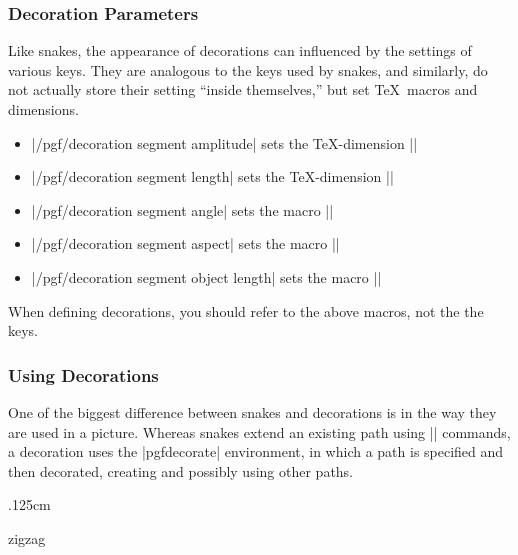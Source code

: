 \subsubsection{Decoration Parameters}

Like snakes, the appearance of decorations can influenced by the 
settings of various keys. They are analogous to the keys used 
by snakes, and similarly, do not actually store their
setting ``inside themselves,'' but set \TeX\ macros and dimensions.

\begin{itemize}
	\item |/pgf/decoration segment amplitude| 
		sets the \TeX-dimension |\pgfdecorationsegmentamplitude|
		
	\item |/pgf/decoration segment length| 
		sets the \TeX-dimension |\pgfdecorationsegmentlength|
		
	\item |/pgf/decoration segment angle| 
		sets the macro |\pgfdecorationsegmentangle|
		
	\item |/pgf/decoration segment aspect| 
		sets the macro |\pgfdecorationsegmentaspect|
		
	\item |/pgf/decoration segment object length| 
		sets the macro |\pgfdecorationsegmentobjectlength|
\end{itemize}

When defining decorations, you should refer to the above macros, 
not the the keys.


\subsubsection{Using Decorations}

One of the biggest difference between snakes and decorations
is in the way they are used in a picture. Whereas snakes
extend an existing path using |\pgfpath| commands, a decoration 
uses the |{pgfdecorate}| environment, in which a path is specified 
and then decorated, creating and possibly using other paths. 


\begin{codeexample}[]
\begin{pgfpicture}
  \pgfdecorationsegmentlength.125cm
  \begin{pgfdecoration}{{zigzag}{\pgfdecoratedpathlength}}
    \pgfpathmoveto{\pgfpoint{1.5cm}{1cm}}
  \end{pgfdecoration}
\end{pgfpicture}
\end{codeexample}

